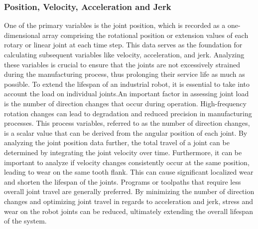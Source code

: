 \subsubsection*{Position, Velocity, Acceleration and Jerk }
One of the primary variables is the joint position, which is recorded as a one-dimensional array comprising the rotational position or extension values of each rotary or linear joint at each time step. This data serves as the foundation for calculating subsequent variables like velocity, acceleration, and jerk. Analyzing these variables is crucial to ensure that the joints are not excessively strained during the manufacturing process, thus prolonging their service life as much as possible. To extend the lifespan of an industrial robot, it is essential to take into account the load on individual joints.\newline An important factor in assessing joint load is the number of direction changes that occur during operation. High-frequency rotation changes can lead to degradation and reduced precision in manufacturing processes. This process variables, referred to as the number of direction changes, is a scalar value that can be derived from the angular position of each joint. By analyzing the joint position data further, the total travel of a joint can be determined by integrating the joint velocity over time. Furthermore, it can be important to analyze if velocity changes consistently occur at the same position, leading to wear on the same tooth flank. This can cause significant localized wear and shorten the lifespan of the joints.
\newpage
Programs or toolpaths that require less overall joint travel are generally preferred. By minimizing the number of direction changes and optimizing joint travel in regards to acceleration and jerk, stress and wear on the robot joints can be reduced, ultimately extending the overall lifespan of the system.



